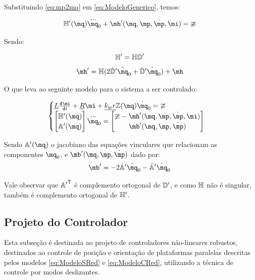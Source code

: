 \documentclass[a4paper,11pt,brazil,fleqn]{article}
\begin{document}
Substituindo \eqref{eq:mp2mq} em \eqref{eq:ModeloGenerico}, temos:

\begin{equation}
\mH'(\mq) \dddot{\mq}_0 + \mh'(\mq,\mp,\dot{\mp}, \mi) = \mup
\end{equation}

Sendo:

\begin{equation}
\mathbb{H}' = \mathbb{H} \mathbb{D}'
\end{equation}
\begin{equation}
\mh' = \mH( 2\dot{\mD}' \ddot{\mq}_0 + \ddot{\mD}' \dot{\mq}_0 ) + \mh
\end{equation}

O que leva ao seguinte modelo para o sistema a ser controlado:

\begin{equation} \label{eq:ModeloCRed}
\begin{cases}
\underline{L} \frac{\dd \mi}{\dd t} + \underline{R} \mi + \underline{k_w r} \mZ (\mq) \dot{\mq}_0= \mup
\\
\begin{bmatrix}
\mH'(\mq) \\
\mA'(\mq)
\end{bmatrix}
\dddot{\mq}_0
=
\begin{bmatrix}
\mup - \mh'(\mq,\mp,\dot{\mp}, \mi) \\
\mb'(\mq,\mp,\dot{\mp})
\end{bmatrix}
\end{cases}
\end{equation}

Sendo $\mA'(\mq)$ o jacobiano das equa\c{c}\~oes vinculares que relacionam as componentes $\mq_0$, e  $\mb'(\mq,\mp,\dot{\mp})$ dado por:
\begin{equation}
\mb' = -2 \dot{\mA}' \ddot{\mq}_0 - \ddot{\mA}' \dot{\mq}_0
\end{equation}

Vale observar que ${\mathbb{A}'}^{\mathsf{T}}$ \'e complemento ortogonal de $\mathbb{D}'$, e como $\mathbb{H}$ n\~ao \'e singular, tamb\'em \'e complemento ortogonal de $\mathbb{H}'$.

\subsection{Projeto do Controlador}\label{S04-6}

Esta subse\c{c}\~ao \'e destinada ao projeto de controladores n\~ao-lineares robustos, destinados ao controle de posi\c{c}\~ao e orienta\c{c}\~ao de plataformas paralelas descritas pelos modelos \eqref{eq:ModeloSRed} e \eqref{eq:ModeloCRed}, utilizando a t\'ecnica de controle por modos deslizantes.
\end{document}
